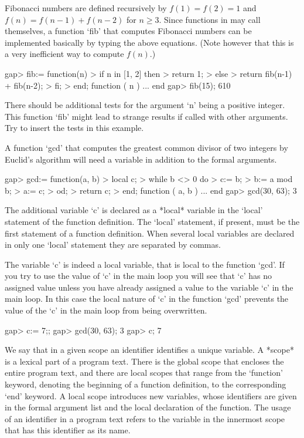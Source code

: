 Fibonacci numbers are defined recursively by $f(1) = f(2) =  1$ and
$f(n) =  f(n-1) + f(n-2)$ for $n \geq 3$.
Since functions in {\GAP} may call themselves,
a function `fib' that computes Fibonacci numbers can be implemented
basically by typing the above equations. (Note however that this is a very
inefficient way to compute $f(n)$.)

\beginexample
gap> fib:= function(n)
>       if n in [1, 2] then
>          return 1;
>       else
>          return fib(n-1) + fib(n-2);
>       fi;
>    end;
function ( n ) ... end
gap> fib(15);
610
\endexample

There should be additional tests for the  argument  `n' being  a positive
integer.   This  function `fib' might  lead to strange  results if called
with other arguments.  Try to insert the tests in this example.


A function `gcd' that computes the greatest common divisor of two
integers by Euclid's algorithm will need a variable in addition to the
formal arguments.

\beginexample
gap> gcd:= function(a, b)
>       local c;
>       while b <> 0 do
>          c:= b;
>          b:= a mod b;
>          a:= c;
>       od;
>       return c;
>    end;
function ( a, b ) ... end
gap> gcd(30, 63);
3
\endexample

The additional  variable `c'  is declared as  a  *local*  variable in the
`local' statement  of the function definition.  The `local' statement, if
present, must  be the first  statement of  a function  definition.   When
several local variables are  declared in only one  `local' statement they
are separated by commas.                                 

The  variable `c'  is  indeed  a local  variable,  that  is local to  the
function `gcd'.  If you try  to use the value of `c' in the main loop you
will see that `c'  has no assigned value unless you have already assigned
a value to the variable `c'  in  the  main loop.  In this case  the local
nature of `c' in the function `gcd' prevents  the value of the `c' in the
main loop from being overwritten.

\beginexample
gap> c:= 7;;
gap> gcd(30, 63);
3
gap> c;
7
\endexample

We say  that in a given scope an identifier identifies a unique variable.
A *scope* is a lexical part of a program text.  There is the global scope
that encloses  the  entire program text, and there are local  scopes that
range from the `function'  keyword, denoting the beginning of  a function
definition, to the corresponding `end' keyword.  A local scope introduces
new  variables, whose identifiers are  given in the formal argument  list
and the local declaration of the function.  The usage of an identifier in
a program text refers to  the  variable in  the  innermost scope that has
this identifier as its name.

